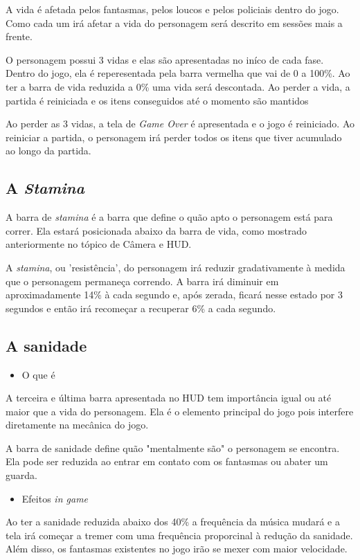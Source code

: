 \documentclass{article}
\begin{document}
A vida é afetada pelos fantasmas, pelos loucos e pelos policiais dentro do jogo. Como cada um irá afetar a vida do personagem será descrito em sessões mais a frente.

O personagem possui 3 vidas e elas são apresentadas no iníco de cada fase. Dentro do jogo, ela é reperesentada pela barra vermelha que vai de 0 a 100\%. Ao ter a barra de vida reduzida a 0\% uma vida será descontada. Ao perder a vida, a partida é reiniciada e os itens conseguidos até o momento são mantidos

Ao perder as 3 vidas, a tela de \textit{Game Over} é apresentada e o jogo é reiniciado. Ao reiniciar a partida, o personagem irá perder todos os itens que tiver acumulado ao longo da partida.

\subsection{A \textit{Stamina}}
A barra de \textit{stamina} é a barra que define o quão apto o personagem está para correr. Ela estará posicionada abaixo da barra de vida, como mostrado anteriormente no tópico de Câmera e HUD.

A \textit{stamina}, ou 'resistência', do personagem irá reduzir gradativamente à medida que o personagem permaneça correndo. A barra irá diminuir em aproximadamente 14\% à cada segundo e, após zerada, ficará nesse estado por 3 segundos e então irá recomeçar a recuperar 6\% a cada segundo.

\subsection{A sanidade}
\begin{itemize}
\item O que é
\end{itemize}
A terceira e última barra apresentada no HUD tem importância igual ou até maior que a vida do personagem. Ela é o elemento principal do jogo pois interfere diretamente na mecânica do jogo. 

A barra de sanidade define quão "mentalmente são" o personagem se encontra. Ela pode ser reduzida ao entrar em contato com os fantasmas ou abater um guarda. 

\begin{itemize}
\item Efeitos \textit{in game}
\end{itemize}
Ao ter a sanidade reduzida abaixo dos 40\% a frequência da música mudará e a tela irá começar a tremer com uma frequência proporcinal à redução da sanidade. Além disso, os fantasmas existentes no jogo irão se mexer com maior velocidade.
\end{document}
